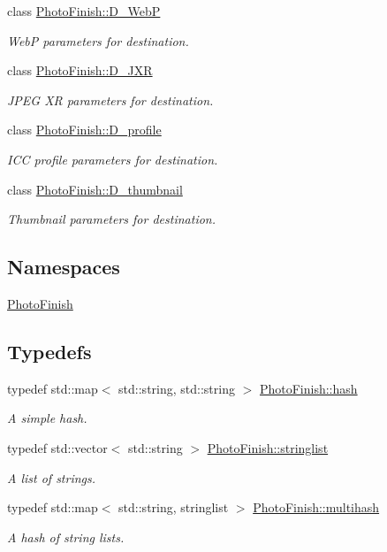 \begin{DoxyCompactItemize}
class \hyperlink{class_photo_finish_1_1_d___web_p}{Photo\+Finish\+::\+D\+\_\+\+WebP}
\begin{DoxyCompactList}\small\item\em WebP parameters for destination. \end{DoxyCompactList}\item 
class \hyperlink{class_photo_finish_1_1_d___j_x_r}{Photo\+Finish\+::\+D\+\_\+\+J\+XR}
\begin{DoxyCompactList}\small\item\em J\+P\+EG XR parameters for destination. \end{DoxyCompactList}\item 
class \hyperlink{class_photo_finish_1_1_d__profile}{Photo\+Finish\+::\+D\+\_\+profile}
\begin{DoxyCompactList}\small\item\em I\+CC profile parameters for destination. \end{DoxyCompactList}\item 
class \hyperlink{class_photo_finish_1_1_d__thumbnail}{Photo\+Finish\+::\+D\+\_\+thumbnail}
\begin{DoxyCompactList}\small\item\em Thumbnail parameters for destination. \end{DoxyCompactList}\end{DoxyCompactItemize}
\subsection*{Namespaces}
\begin{DoxyCompactItemize}
\item 
 \hyperlink{namespace_photo_finish}{Photo\+Finish}
\end{DoxyCompactItemize}
\subsection*{Typedefs}
\begin{DoxyCompactItemize}
\item 
typedef std\+::map$<$ std\+::string, std\+::string $>$ \hyperlink{namespace_photo_finish_a5cfd59b3790dc7319dde2b4c0f96ac5a}{Photo\+Finish\+::hash}
\begin{DoxyCompactList}\small\item\em A simple hash. \end{DoxyCompactList}\item 
typedef std\+::vector$<$ std\+::string $>$ \hyperlink{namespace_photo_finish_a5b181b4da2f4f053ba4db6273f62310d}{Photo\+Finish\+::stringlist}
\begin{DoxyCompactList}\small\item\em A list of strings. \end{DoxyCompactList}\item 
typedef std\+::map$<$ std\+::string, stringlist $>$ \hyperlink{namespace_photo_finish_a6f41796f162687538b7da5c7a95e2d18}{Photo\+Finish\+::multihash}
\begin{DoxyCompactList}\small\item\em A hash of string lists. \end{DoxyCompactList}\end{DoxyCompactItemize}
